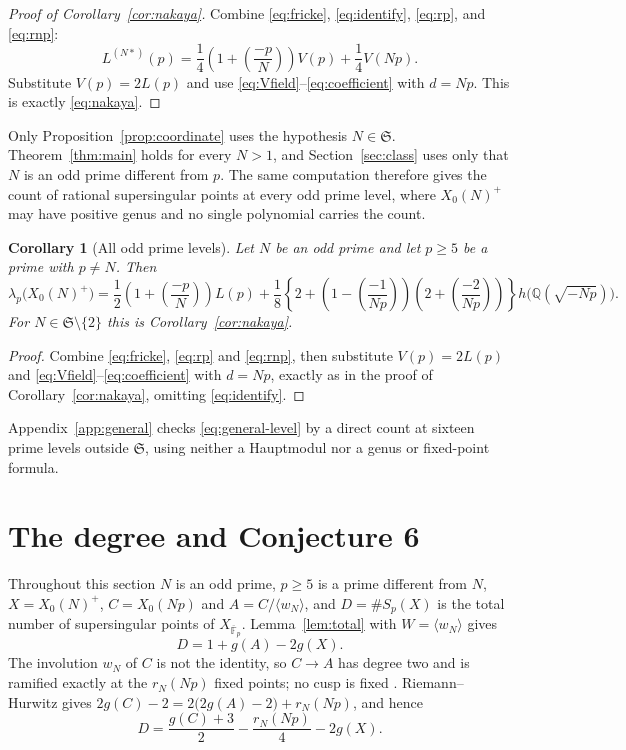\documentclass[11pt,a4paper]{article}
\newtheorem{corollary}[theorem]{Corollary}
\theoremstyle{remark}\newtheorem{remark}[theorem]{Remark}
\numberwithin{equation}{section}
\newcommand{\Q}{\mathbb Q}\newcommand{\Z}{\mathbb Z}
\newcommand{\kk}{\overline{\mathbb F}_p}
\newcommand{\leg}[2]{\left(\frac{#1}{#2}\right)}
\newcommand{\hK}[1]{h\bigl(\Q(\sqrt{-#1})\bigr)}
\begin{document}
	\begin{proof}[Proof of Corollary~\ref{cor:nakaya}]
		Combine \eqref{eq:fricke}, \eqref{eq:identify}, \eqref{eq:rp}, and \eqref{eq:rnp}:
		\[
		L^{(N*)}(p)=\frac14\left(1+\leg{-p}{N}\right)V(p)+\frac14V(Np).
		\]
		Substitute $V(p)=2L(p)$ and use \eqref{eq:Vfield}--\eqref{eq:coefficient} with $d=Np$. This is exactly \eqref{eq:nakaya}.
	\end{proof}
	
	Only Proposition~\ref{prop:coordinate} uses the hypothesis $N\in\mathfrak S$. Theorem~\ref{thm:main} holds for every $N>1$, and Section~\ref{sec:class} uses only that $N$ is an odd prime different from $p$. The same computation therefore gives the count of rational supersingular points at every odd prime level, where $X_0(N)^+$ may have positive genus and no single polynomial carries the count.
	
	\begin{corollary}[All odd prime levels]\label{cor:general}
		Let $N$ be an odd prime and let $p\geq5$ be a prime with $p\neq N$. Then
		\begin{equation}\label{eq:general-level}
			\lambda_p\bigl(X_0(N)^+\bigr)
			=\frac12\left(1+\leg{-p}{N}\right)L(p)
			+\frac18\left\{2+\left(1-\leg{-1}{Np}\right)
			\left(2+\leg{-2}{Np}\right)\right\}\hK{Np}.
		\end{equation}
		For $N\in\mathfrak S\setminus\{2\}$ this is Corollary~\ref{cor:nakaya}.
	\end{corollary}
	\begin{proof}
		Combine \eqref{eq:fricke}, \eqref{eq:rp} and \eqref{eq:rnp}, then substitute $V(p)=2L(p)$ and \eqref{eq:Vfield}--\eqref{eq:coefficient} with $d=Np$, exactly as in the proof of Corollary~\ref{cor:nakaya}, omitting \eqref{eq:identify}.
	\end{proof}
	
	Appendix~\ref{app:general} checks \eqref{eq:general-level} by a direct count at sixteen prime levels outside $\mathfrak S$, using neither a Hauptmodul nor a genus or fixed-point formula.
	
	\section{The degree and Conjecture 6}\label{sec:degree}
	Throughout this section $N$ is an odd prime, $p\geq5$ is a prime different from $N$, $X=X_0(N)^+$, $C=X_0(Np)$ and $A=C/\langle w_N\rangle$, and $D=\#S_p(X)$ is the total number of supersingular points of $X_{\kk}$. Lemma~\ref{lem:total} with $W=\langle w_N\rangle$ gives
	\begin{equation}\label{eq:Dtotal}
		D=1+g(A)-2g(X).
	\end{equation}
	The involution $w_N$ of $C$ is not the identity, so $C\to A$ has degree two and is ramified exactly at the $r_N(Np)$ fixed points; no cusp is fixed \cite[Proposition 3]{Ogg}. Riemann--Hurwitz gives $2g(C)-2=2\bigl(2g(A)-2\bigr)+r_N(Np)$, and hence
	\begin{equation}\label{eq:RH}
		D=\frac{g(C)+3}{2}-\frac{r_N(Np)}{4}-2g(X).
	\end{equation}
	
\end{document}
